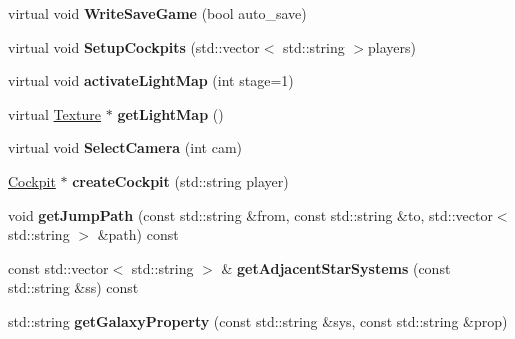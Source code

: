 \begin{DoxyCompactItemize}
\item 
virtual void {\bfseries Write\+Save\+Game} (bool auto\+\_\+save)\hypertarget{classUniverse_a235d163d16003ddc050681572b37e8cb}{}\label{classUniverse_a235d163d16003ddc050681572b37e8cb}

\item 
virtual void {\bfseries Setup\+Cockpits} (std\+::vector$<$ std\+::string $>$players)\hypertarget{classUniverse_a9f60651000b343bc485bcb1b15421801}{}\label{classUniverse_a9f60651000b343bc485bcb1b15421801}

\item 
virtual void {\bfseries activate\+Light\+Map} (int stage=1)\hypertarget{classUniverse_aaa2abb9d2c76a83f36d36a5712fd1f45}{}\label{classUniverse_aaa2abb9d2c76a83f36d36a5712fd1f45}

\item 
virtual \hyperlink{classTexture}{Texture} $\ast$ {\bfseries get\+Light\+Map} ()\hypertarget{classUniverse_a3cb0e00002c522a4ba9bda2257129861}{}\label{classUniverse_a3cb0e00002c522a4ba9bda2257129861}

\item 
virtual void {\bfseries Select\+Camera} (int cam)\hypertarget{classUniverse_ad7d3ab546b961832c716383c6033f2a3}{}\label{classUniverse_ad7d3ab546b961832c716383c6033f2a3}

\item 
\hyperlink{classCockpit}{Cockpit} $\ast$ {\bfseries create\+Cockpit} (std\+::string player)\hypertarget{classUniverse_a7b3362e44e02301f7d2b307379b40ad5}{}\label{classUniverse_a7b3362e44e02301f7d2b307379b40ad5}

\item 
void {\bfseries get\+Jump\+Path} (const std\+::string \&from, const std\+::string \&to, std\+::vector$<$ std\+::string $>$ \&path) const \hypertarget{classUniverse_aa902a4110dfbce58b75c2e5a9d5d2163}{}\label{classUniverse_aa902a4110dfbce58b75c2e5a9d5d2163}

\item 
const std\+::vector$<$ std\+::string $>$ \& {\bfseries get\+Adjacent\+Star\+Systems} (const std\+::string \&ss) const \hypertarget{classUniverse_a29f7c2744d7a0f190313457c30a4db66}{}\label{classUniverse_a29f7c2744d7a0f190313457c30a4db66}

\item 
std\+::string {\bfseries get\+Galaxy\+Property} (const std\+::string \&sys, const std\+::string \&prop)\hypertarget{classUniverse_a68222bc0ea1f2e422a56e5b3c41ed3c3}{}\label{classUniverse_a68222bc0ea1f2e422a56e5b3c41ed3c3}


\end{DoxyCompactItemize}
